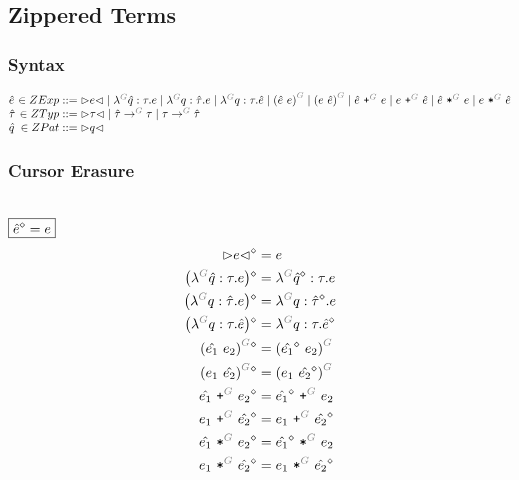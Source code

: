 \subsection{Zippered Terms}


\subsubsection{Syntax}

\[
  \arraycolsep=0pt
  \begin{array}{lrlll}
    \hat{e} & {}\in ZExp & {}::={} &
      \cursor{e}
      \mid \eFun{G}{\hat{q}}{\tau}{e}
      \mid \eFun{G}{q}{\hat{\tau}}{e}
      \mid \eFun{G}{q}{\tau}{\hat{e}}
      \mid \eApp{G}{\hat{e}}{e}
      \mid \eApp{G}{e}{\hat{e}}
      \mid \ePlus{G}{\hat{e}}{e}
      \mid \ePlus{G}{e}{\hat{e}}
      \mid \eTimes{G}{\hat{e}}{e}
      \mid \eTimes{G}{e}{\hat{e}}
    \\
    \hat{\tau} & {}\in ZTyp & {}::={} &
      \cursor{\tau}
      \mid \tArrow{G}{\hat{\tau}}{\tau}
      \mid \tArrow{G}{\tau}{\hat{\tau}}
    \\
    \hat{q} & {}\in ZPat & {}::={} &
      \cursor{q}
    \\
  \end{array}
\]


\subsubsection{Cursor Erasure}\hspace*{\fill} \\

\noindent $\boxed{\hat{e}\mathclose{}^{\diamond} = e}$
%
\begin{align*}
  \erase{\cursor{e}} &= e \\
  \erase{\left(\eFun{G}{\hat{q}}{\tau}{e}\right)} &= \eFun{G}{\erase{\hat{q}}}{\tau}{e} \\
  \erase{\left(\eFun{G}{q}{\hat{\tau}}{e}\right)} &= \eFun{G}{q}{\erase{\hat{\tau}}}{e} \\
  \erase{\left(\eFun{G}{q}{\tau}{\hat{e}}\right)} &= \eFun{G}{q}{\tau}{\erase{\hat{e}}} \\
  \erase{\eApp{G}{\hat{e_1}}{e_2}} &= \eApp{G}{\erase{\hat{e_1}}}{e_2} \\
  \erase{\eApp{G}{e_1}{\hat{e_2}}} &= \eApp{G}{e_1}{\erase{\hat{e_2}}} \\
  \erase{\ePlus{G}{\hat{e_1}}{e_2}} &= \ePlus{G}{\erase{\hat{e_1}}}{e_2} \\
  \erase{\ePlus{G}{e_1}{\hat{e_2}}} &= \ePlus{G}{e_1}{\erase{\hat{e_2}}} \\
  \erase{\eTimes{G}{\hat{e_1}}{e_2}} &= \eTimes{G}{\erase{\hat{e_1}}}{e_2} \\
  \erase{\eTimes{G}{e_1}{\hat{e_2}}} &= \eTimes{G}{e_1}{\erase{\hat{e_2}}}
\end{align*}

